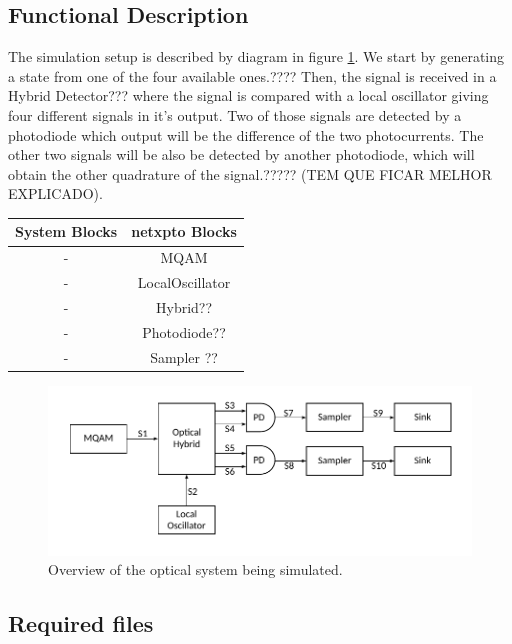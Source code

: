 \subsection*{Functional Description}

The simulation setup is described by diagram in figure \ref{fig:setup}. We start by generating a state from one of the four available ones.???? Then, the signal is received in a Hybrid Detector??? where the signal is compared with a local oscillator giving four different signals in it's output. Two of those signals are detected by a photodiode which output will be the difference of the two photocurrents. The other two signals will be also be detected by another photodiode, which will obtain the other quadrature of the signal.????? (TEM QUE FICAR MELHOR EXPLICADO).



\begin{table}[H]
\centering
\begin{tabular}{c|c}
System Blocks          & netxpto Blocks       \\ \hline
- & MQAM \\
- & LocalOscillator \\
- & Hybrid?? \\
- & Photodiode??\\
- & Sampler ??\\
\end{tabular}
\end{table}


\begin{figure}[h]
\centering
\includegraphics[width=\linewidth]{./sdf/quantum_noise/figures/scheme1.pdf}
\caption{Overview of the optical system being simulated.}
\label{fig:setup}
\end{figure}


\subsection*{Required files}\label{Required files}

